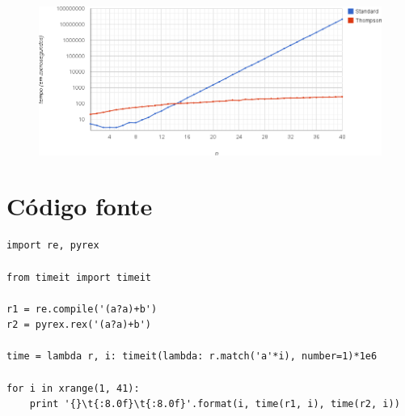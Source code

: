 \documentclass[a4paper,12pt,oneside,onecolumn]{uerj}
\begin{document}
\begin{figure}[ht]
  \centering
  \includegraphics[scale=0.5]{figures/benchmark1.png}
\end{figure}

\section{Código fonte}

\begin{verbatim}
import re, pyrex

from timeit import timeit

r1 = re.compile('(a?a)+b')
r2 = pyrex.rex('(a?a)+b')

time = lambda r, i: timeit(lambda: r.match('a'*i), number=1)*1e6

for i in xrange(1, 41):
    print '{}\t{:8.0f}\t{:8.0f}'.format(i, time(r1, i), time(r2, i))
\end{verbatim}


\end{document}
